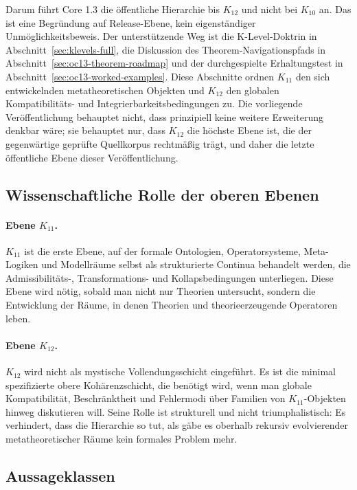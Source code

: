 Darum führt Core 1.3 die öffentliche Hierarchie bis \(K_{12}\) und nicht
bei \(K_{10}\) an. Das ist eine Begründung auf Release-Ebene, kein
eigenständiger Unmöglichkeitsbeweis. Der unterstützende Weg ist die
K-Level-Doktrin in Abschnitt~\ref{sec:klevels-full}, die Diskussion des
Theorem-Navigationspfads in Abschnitt~\ref{sec:oc13-theorem-roadmap} und der
durchgespielte Erhaltungstest in Abschnitt~\ref{sec:oc13-worked-examples}.
Diese Abschnitte ordnen \(K_{11}\) den sich entwickelnden metatheoretischen
Objekten und \(K_{12}\) den globalen Kompatibilitäts- und
Integrierbarkeitsbedingungen zu. Die vorliegende Veröffentlichung behauptet
nicht, dass prinzipiell keine weitere Erweiterung denkbar wäre; sie behauptet
nur, dass \(K_{12}\) die höchste Ebene ist, die der gegenwärtige geprüfte
Quellkorpus rechtmäßig trägt, und daher die letzte öffentliche Ebene dieser
Veröffentlichung.

\subsection{Wissenschaftliche Rolle der oberen Ebenen}

\paragraph{Ebene \texorpdfstring{$K_{11}$}{K11}.}
\(K_{11}\) ist die erste Ebene, auf der formale Ontologien, Operatorsysteme,
Meta-Logiken und Modellräume selbst als strukturierte Continua behandelt
werden, die Admissibilitäts-, Transformations- und Kollapsbedingungen
unterliegen.
Diese Ebene wird nötig, sobald man nicht nur Theorien untersucht, sondern die
Entwicklung der Räume, in denen Theorien und theorieerzeugende Operatoren leben.

\paragraph{Ebene \texorpdfstring{$K_{12}$}{K12}.}
\(K_{12}\) wird nicht als mystische Vollendungsschicht eingeführt.
Es ist die minimal spezifizierte obere Kohärenzschicht, die benötigt wird,
wenn man globale Kompatibilität, Beschränktheit und Fehlermodi über Familien
von \(K_{11}\)-Objekten hinweg diskutieren will.
Seine Rolle ist strukturell und nicht triumphalistisch: Es verhindert, dass
die Hierarchie so tut, als gäbe es oberhalb rekursiv evolvierender
metatheoretischer Räume kein formales Problem mehr.

\subsection{Aussageklassen}

